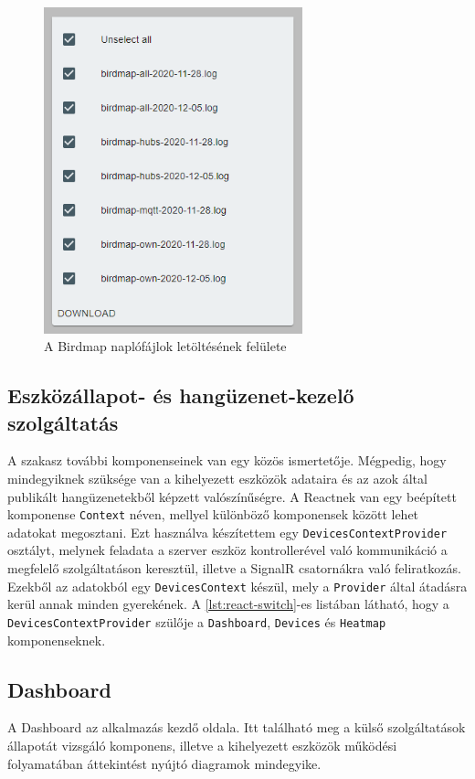 \begin{figure}[!ht]
    \centering
    \includegraphics[width=75mm, keepaspectratio]{figures/birdmap-logs.png}
    \caption{A Birdmap naplófájlok letöltésének felülete}
    \label{fig:birdmap-logs}
\end{figure}
\subsection{Eszközállapot- és hangüzenet-kezelő szolgáltatás}
A szakasz további komponenseinek van egy közös ismertetője. Mégpedig, hogy mindegyiknek szüksége van a kihelyezett eszközök adataira
és az azok által publikált hangüzenetekből képzett valószínűségre.
A Reactnek van egy beépített komponense \verb+Context+ \cite{react-context} néven, mellyel különböző komponensek között lehet adatokat megosztani.
Ezt használva készítettem egy \verb+DevicesContextProvider+ osztályt, melynek feladata a szerver eszköz kontrollerével való kommunikáció a megfelelő szolgáltatáson keresztül,
illetve a SignalR csatornákra való feliratkozás. Ezekből az adatokból egy \verb+DevicesContext+ készül, mely a \verb+Provider+ által átadásra kerül annak minden gyerekének.
A \ref{lst:react-switch}-es listában látható, hogy a \verb+DevicesContextProvider+ szülője a \verb+Dashboard+, \verb+Devices+ és \verb+Heatmap+ komponenseknek.

\subsection{Dashboard}
A Dashboard az alkalmazás kezdő oldala. Itt található meg a külső szolgáltatások állapotát vizsgáló komponens,
illetve a kihelyezett eszközök működési folyamatában áttekintést nyújtó diagramok mindegyike.

